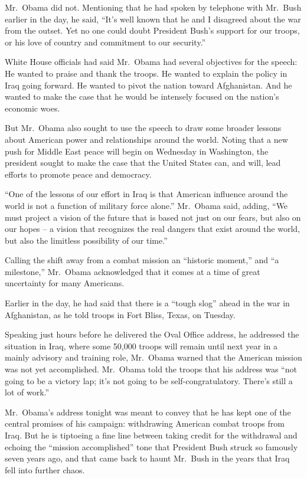 ﻿\documentclass[12pt]{article}
\begin{document}
Mr.~Obama did not. Mentioning that he had spoken by telephone with Mr.~Bush earlier in the day, he
said, ``It's well known that he and I disagreed about the war from the outset. Yet no one could
doubt President Bush's support for our troops, or his love of country and commitment to our
security.''

White House officials had said Mr.~Obama had several objectives for the speech: He wanted to praise
and thank the troops. He wanted to explain the policy in Iraq going forward. He wanted to pivot the
nation toward Afghanistan. And he wanted to make the case that he would be intensely focused on the
nation's economic woes.

But Mr.~Obama also sought to use the speech to draw some broader lessons about American power and
relationships around the world. Noting that a new push for Middle East peace will begin on Wednesday
in Washington, the president sought to make the case that the United States can, and will, lead
efforts to promote peace and democracy.

``One of the lessons of our effort in Iraq is that American influence around the world is not a
function of military force alone.'' Mr.~Obama said, adding, ``We must project a vision of the future
that is based not just on our fears, but also on our hopes -- a vision that recognizes the real
dangers that exist around the world, but also the limitless possibility of our time.''

Calling the shift away from a combat mission an ``historic moment,'' and ``a milestone,'' Mr.~Obama
acknowledged that it comes at a time of great uncertainty for many Americans.

Earlier in the day, he had said that there is a ``tough slog'' ahead in the war in Afghanistan, as
he told troops in Fort Bliss, Texas, on Tuesday.

Speaking just hours before he delivered the Oval Office address, he addressed the situation in Iraq,
where some 50,000 troops will remain until next year in a mainly advisory and training role,
Mr.~Obama warned that the American mission was not yet accomplished. Mr.~Obama told the troops that
his address was ``not going to be a victory lap; it's not going to be self-congratulatory. There's
still a lot of work.''

Mr.~Obama's address tonight was meant to convey that he has kept one of the central promises of his
campaign: withdrawing American combat troops from Iraq. But he is tiptoeing a fine line between
taking credit for the withdrawal and echoing the ``mission accomplished'' tone that President Bush
struck so famously seven years ago, and that came back to haunt Mr.~Bush in the years that Iraq fell
into further chaos.
\end{document}
